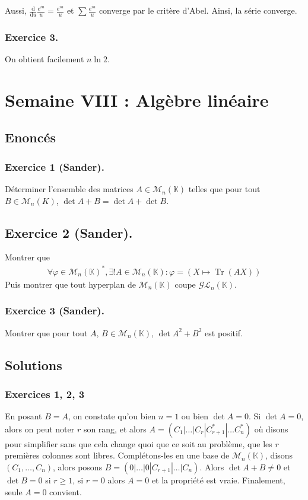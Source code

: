 \documentclass{article}
\DeclareMathOperator{\Tr}{Tr}
\begin{document}
Aussi, $\frac{\mathrm{d}}{\mathrm{d}u} \frac{e^{iu}}{u} = \frac{e^{iu}}{u}$ et $\sum \frac{e^{i u}}{u}$ converge par le critère d'Abel. Ainsi, la série converge.

\subsubsection*{Exercice 3.}
	On obtient facilement $n\ln 2$.
	\section{Semaine VIII : Algèbre linéaire}
	\subsection*{Enoncés}
	\subsubsection*{Exercice 1 (Sander).}
	Déterminer l'ensemble des matrices $A\in \mathcal{M}_n(\mathbb{K})$ telles que pour tout $B\in\mathcal{M}_n(K)$, $\det A + B = \det A + \det B$.
	\subsection*{Exercice 2 (Sander).}
	Montrer que 
	\begin{align*}
		\forall \varphi \in \mathcal{M}_n(\mathbb{K})^*, \exists !A\in \mathcal{M}_n(\mathbb{K}) : \varphi = (X\mapsto \Tr(AX))
	\end{align*}
	Puis montrer que tout hyperplan de $\mathcal{M}_n(\mathbb{K})$ coupe $\mathcal{GL}_n(\mathbb{K})$.
	\subsubsection*{Exercice 3 (Sander).}
	Montrer que pour tout $A,\, B \in\mathcal{M}_n(\mathbb{K})$, $\det A^2 + B^2$ est positif.
	\subsection*{Solutions}
	\subsubsection*{Exercices 1, 2, 3}
	En posant $B = A$, on constate qu'ou bien $n=1$ ou bien $\det A = 0$. Si $\det A = 0$, alors on peut noter $r$ son rang, et alors $A = (C_1|\ldots|C_r|C^*_{r+1}|\ldots C^*_n)$ où disons pour simplifier sans que cela change quoi que ce soit au problème, que les $r$ premières colonnes sont libres. Complétons-les en une base de $\mathcal{M}_n(\mathbb{K})$, disons $(C_1, \ldots, C_n)$, alors posons $B = (0|\ldots|0|C_{r+1}|\ldots|C_n)$. Alors $\det A + B \neq 0$ et $\det B = 0$ si $r\geq 1$, si $r=0$ alors $A = 0$ et la propriété est vraie. Finalement, seule $A=0$ convient.
\end{document}
